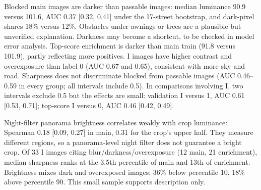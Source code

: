 Blocked main images are darker than passable images: median luminance 90.9 versus 101.6, AUC 0.37 [0.32, 0.41] under the 17-street bootstrap, and dark-pixel shares 18\% versus 12\%. Obstacles under awnings or trees are a plausible but unverified explanation. Darkness may become a shortcut, to be checked in model error analysis. Top-score enrichment is darker than main train (91.8 versus 101.9), partly reflecting more positives. I images have higher contrast and overexposure than label 0 (AUC 0.67 and 0.65), consistent with more sky and road. Sharpness does not discriminate blocked from passable images (AUC 0.46--0.59 in every group; all intervals include 0.5). In comparisons involving I, two intervals exclude 0.5 but the effects are small: validation I versus 1, AUC 0.61 [0.53, 0.71]; top-score I versus 0, AUC 0.46 [0.42, 0.49].

Night-filter panorama brightness correlates weakly with crop luminance: Spearman 0.18 [0.09, 0.27] in main, 0.31 for the crop's upper half. They measure different regions, so a panorama-level night filter does not guarantee a bright crop. Of 33 I images citing blur/darkness/overexposure (12 main, 21 enrichment), median sharpness ranks at the 3.5th percentile of main and 13th of enrichment. Brightness mixes dark and overexposed images: 36\% below percentile 10, 18\% above percentile 90. This small sample supports description only.

